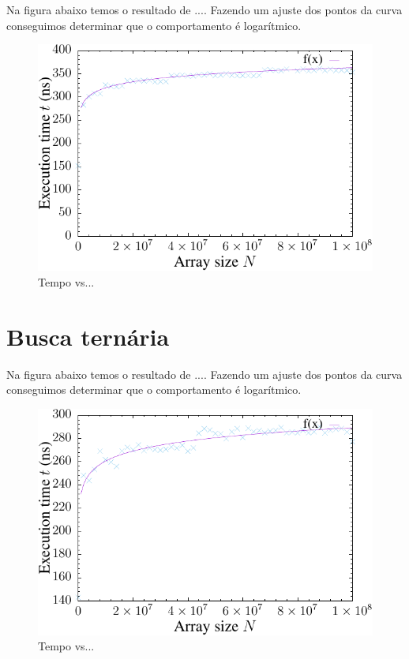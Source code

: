 Na figura abaixo temos o resultado de .... Fazendo um ajuste dos pontos da curva conseguimos determinar que o comportamento é logarítmico.


\begin{figure}[H]
  \centering
  \includegraphics[scale=1.2]{../plots/bsearch_rec_time.pdf}
  \caption{Tempo vs...}
\end{figure} \label{fig:bseach_rec_time}


\section{Busca ternária}

Na figura abaixo temos o resultado de .... Fazendo um ajuste dos pontos da curva conseguimos determinar que o comportamento é logarítmico.


\begin{figure}[H]
  \centering
  \includegraphics[scale=1.2]{../plots/tsearch_it_time.pdf}
  \caption{Tempo vs...}
\end{figure} \label{fig:tseach_it_time}

